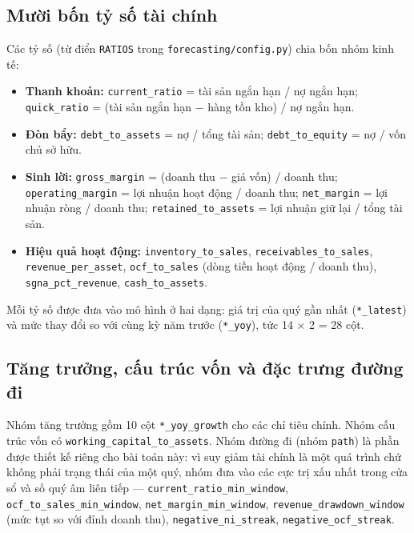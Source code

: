 \documentclass[13pt,a4paper]{extreport}
\begin{document}
\subsection{Mười bốn tỷ số tài chính}

Các tỷ số (từ điển \texttt{RATIOS} trong \texttt{forecasting/config.py}) chia bốn nhóm kinh tế:

\begin{itemize}
\item \textbf{Thanh khoản:} \texttt{current\_ratio} = tài sản ngắn hạn / nợ ngắn hạn; \texttt{quick\_ratio} = (tài sản ngắn hạn − hàng tồn kho) / nợ ngắn hạn.
\item \textbf{Đòn bẩy:} \texttt{debt\_to\_assets} = nợ / tổng tài sản; \texttt{debt\_to\_equity} = nợ / vốn chủ sở hữu.
\item \textbf{Sinh lời:} \texttt{gross\_margin} = (doanh thu − giá vốn) / doanh thu; \texttt{operating\_margin} = lợi nhuận hoạt động / doanh thu; \texttt{net\_margin} = lợi nhuận ròng / doanh thu; \texttt{retained\_to\_assets} = lợi nhuận giữ lại / tổng tài sản.
\item \textbf{Hiệu quả hoạt động:} \texttt{inventory\_to\_sales}, \texttt{receivables\_to\_sales}, \texttt{revenue\_per\_asset}, \texttt{ocf\_to\_sales} (dòng tiền hoạt động / doanh thu), \texttt{sgna\_pct\_revenue}, \texttt{cash\_to\_assets}.
\end{itemize}

Mỗi tỷ số được đưa vào mô hình ở hai dạng: giá trị của quý gần nhất (\texttt{*\_latest}) và mức thay đổi so với cùng kỳ năm trước (\texttt{*\_yoy}), tức 14 × 2 = 28 cột.

\subsection{Tăng trưởng, cấu trúc vốn và đặc trưng đường đi}

Nhóm tăng trưởng gồm 10 cột \texttt{*\_yoy\_growth} cho các chỉ tiêu chính. Nhóm cấu trúc vốn có \texttt{working\_capital\_to\_assets}. Nhóm đường đi (nhóm \texttt{path}) là phần được thiết kế riêng cho bài toán này: vì suy giảm tài chính là một quá trình chứ không phải trạng thái của một quý, nhóm đưa vào các cực trị xấu nhất trong cửa sổ và số quý âm liên tiếp — \texttt{current\_ratio\_min\_window}, \texttt{ocf\_to\_sales\_min\_window}, \texttt{net\_margin\_min\_window}, \texttt{revenue\_drawdown\_window} (mức tụt so với đỉnh doanh thu), \texttt{negative\_ni\_streak}, \texttt{negative\_ocf\_streak}.
\end{document}
